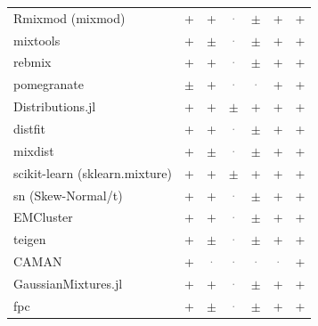 \documentclass[10pt,a4paper]{article}
\begin{document}
\begin{landscape}
{\begin{longtable}{@{}l *{6}{c}@{}}
Rmixmod (mixmod) & \cellcolor{yes!35}+ & \cellcolor{yes!35}+ & \textcolor{gray}{·} & \cellcolor{part!45}$\pm$ & \cellcolor{yes!35}+ & \cellcolor{yes!35}+ \\
mixtools & \cellcolor{yes!35}+ & \cellcolor{part!45}$\pm$ & \textcolor{gray}{·} & \cellcolor{part!45}$\pm$ & \cellcolor{yes!35}+ & \cellcolor{yes!35}+ \\
rebmix & \cellcolor{yes!35}+ & \cellcolor{yes!35}+ & \textcolor{gray}{·} & \cellcolor{part!45}$\pm$ & \cellcolor{yes!35}+ & \cellcolor{yes!35}+ \\
pomegranate & \cellcolor{part!45}$\pm$ & \cellcolor{yes!35}+ & \textcolor{gray}{·} & \textcolor{gray}{·} & \cellcolor{yes!35}+ & \cellcolor{yes!35}+ \\
Distributions.jl & \cellcolor{yes!35}+ & \cellcolor{yes!35}+ & \cellcolor{part!45}$\pm$ & \cellcolor{yes!35}+ & \cellcolor{yes!35}+ & \cellcolor{yes!35}+ \\
distfit & \cellcolor{yes!35}+ & \cellcolor{yes!35}+ & \textcolor{gray}{·} & \cellcolor{part!45}$\pm$ & \cellcolor{yes!35}+ & \cellcolor{yes!35}+ \\
mixdist & \cellcolor{yes!35}+ & \cellcolor{part!45}$\pm$ & \textcolor{gray}{·} & \cellcolor{part!45}$\pm$ & \cellcolor{yes!35}+ & \cellcolor{yes!35}+ \\
scikit-learn (sklearn.mixture) & \cellcolor{yes!35}+ & \cellcolor{yes!35}+ & \cellcolor{part!45}$\pm$ & \cellcolor{yes!35}+ & \cellcolor{yes!35}+ & \cellcolor{yes!35}+ \\
sn (Skew-Normal/t) & \cellcolor{yes!35}+ & \cellcolor{yes!35}+ & \textcolor{gray}{·} & \cellcolor{part!45}$\pm$ & \cellcolor{yes!35}+ & \cellcolor{yes!35}+ \\
EMCluster & \cellcolor{yes!35}+ & \cellcolor{yes!35}+ & \textcolor{gray}{·} & \cellcolor{part!45}$\pm$ & \cellcolor{yes!35}+ & \cellcolor{yes!35}+ \\
teigen & \cellcolor{yes!35}+ & \cellcolor{part!45}$\pm$ & \textcolor{gray}{·} & \cellcolor{part!45}$\pm$ & \cellcolor{yes!35}+ & \cellcolor{yes!35}+ \\
CAMAN & \cellcolor{yes!35}+ & \textcolor{gray}{·} & \textcolor{gray}{·} & \textcolor{gray}{·} & \textcolor{gray}{·} & \cellcolor{yes!35}+ \\
GaussianMixtures.jl & \cellcolor{yes!35}+ & \cellcolor{yes!35}+ & \textcolor{gray}{·} & \cellcolor{part!45}$\pm$ & \cellcolor{yes!35}+ & \cellcolor{yes!35}+ \\
fpc & \cellcolor{yes!35}+ & \cellcolor{part!45}$\pm$ & \textcolor{gray}{·} & \cellcolor{part!45}$\pm$ & \cellcolor{yes!35}+ & \cellcolor{yes!35}+ \\

\end{longtable}}
\end{landscape}
\end{document}
